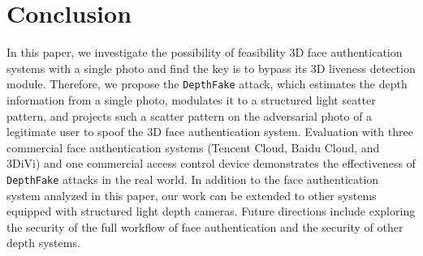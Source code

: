 \section{Conclusion}

In this paper, we investigate the possibility of feasibility 3D face authentication systems with a single photo and find the key is to bypass its 3D liveness detection module.
Therefore, we propose the \texttt{DepthFake} attack, which estimates the depth information from a single photo, modulates it to a structured light scatter pattern, and projects such a scatter pattern  on the adversarial photo of a legitimate user to spoof the 3D face authentication system.
Evaluation with three commercial face authentication systems (Tencent Cloud, Baidu Cloud, and 3DiVi) and one commercial access control device demonstrates the effectiveness of \texttt{DepthFake}  attacks in the real world. In addition to the face authentication system analyzed in this paper, our work can be extended to other systems equipped with structured light depth cameras. Future directions include exploring the security of the full workflow of face authentication and the security of other depth systems.